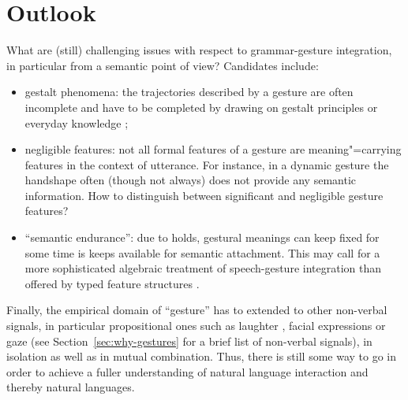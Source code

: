 \documentclass[output=paper]{langsci/langscibook}
\begin{document}
\section{Outlook}
\label{sec:outlook}

What are (still) challenging issues with respect to grammar-gesture integration, in particular from a semantic point of view? Candidates include:

\begin{itemize}
\item gestalt phenomena: the trajectories described by a gesture are often incomplete and have to be completed by drawing on gestalt principles or everyday knowledge \citep{Luecking:2016};
\item negligible features: not all formal features of a gesture are meaning"=carrying features in the context of utterance. For instance, in a dynamic gesture the handshape often (though not always) does not provide any semantic information. How to distinguish between significant and negligible gesture features?
\item \enquote{semantic endurance}: due to holds, gestural meanings can keep fixed for some time is keeps available for semantic attachment. This may call for a more sophisticated algebraic treatment of speech-gesture integration than offered by typed feature structures \citep{Rieser:2015}.
\end{itemize}

Finally, the empirical domain of \enquote{gesture} has to extended to other non-verbal signals, in particular propositional ones such as laughter \citep{Ginzburg:Breitholz:Cooper:Hough:Tian:2015}, facial expressions or gaze (see Section~\ref{sec:why-gestures} for a brief list of non-verbal signals), in isolation as well as in mutual combination.
%
Thus, there is still some way to go in order to achieve a fuller understanding of natural language interaction and thereby natural languages.


 




{\sloppy
\printbibliography[heading=subbibliography,notkeyword=this]
}
\end{document}
